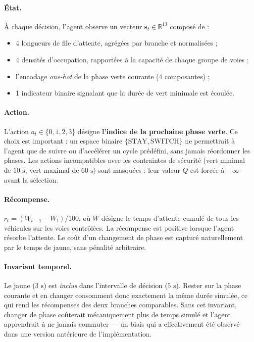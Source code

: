 \documentclass[11pt,a4paper]{article}
\begin{document}
\paragraph{État.} À chaque décision, l'agent observe un vecteur
$\mathbf{s}_t \in \mathbb{R}^{13}$ composé de :
\begin{itemize}
  \item 4 longueurs de file d'attente, agrégées par branche et normalisées ;
  \item 4 densités d'occupation, rapportées à la capacité de chaque groupe de voies ;
  \item l'encodage \textit{one-hot} de la phase verte courante (4 composantes) ;
  \item 1 indicateur binaire signalant que la durée de vert minimale est écoulée.
\end{itemize}

\paragraph{Action.} L'action $a_t \in \{0,1,2,3\}$ désigne \textbf{l'indice de la
prochaine phase verte}. Ce choix est important : un espace binaire
$\{\text{STAY}, \text{SWITCH}\}$ ne permettrait à l'agent que de suivre ou d'accélérer
un cycle prédéfini, sans jamais réordonner les phases. Les actions incompatibles avec
les contraintes de sécurité (vert minimal de $10\text{ s}$, vert maximal de $60\text{ s}$)
sont masquées : leur valeur $Q$ est forcée à $-\infty$ avant la sélection.

\paragraph{Récompense.} $r_t = (W_{t-1} - W_t)/100$, où $W$ désigne le temps
d'attente cumulé de tous les véhicules sur les voies contrôlées. La récompense est
positive lorsque l'agent résorbe l'attente. Le coût d'un changement de phase est
capturé naturellement par le temps de jaune, sans pénalité arbitraire.

\paragraph{Invariant temporel.} Le jaune ($3\text{ s}$) est \emph{inclus} dans
l'intervalle de décision ($5\text{ s}$). Rester sur la phase courante et en changer
consomment donc exactement la même durée simulée, ce qui rend les récompenses des
deux branches comparables. Sans cet invariant, changer de phase coûterait
mécaniquement plus de temps simulé et l'agent apprendrait à ne jamais commuter --- un
biais qui a effectivement été observé dans une version antérieure de
l'implémentation.
\end{document}
